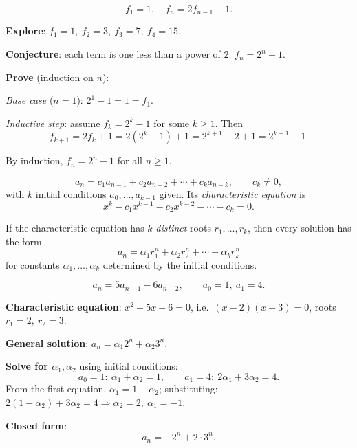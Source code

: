 \documentclass[11pt]{article}
\begin{document}
\begin{example}
\[
f_1=1,\quad f_n = 2f_{n-1}+1.
\]

\textbf{Explore}: $f_1=1,\ f_2=3,\ f_3=7,\ f_4=15$.

\textbf{Conjecture}: each term is one less than a power of $2$: $f_n = 2^n-1$.

\textbf{Prove} (induction on $n$):

\textit{Base case} ($n=1$): $2^1-1=1=f_1$.

\textit{Inductive step}: assume $f_k=2^k-1$ for some $k\ge1$. Then
\[
f_{k+1} = 2f_k+1 = 2(2^k-1)+1 = 2^{k+1}-2+1 = 2^{k+1}-1.
\]

By induction, $f_n=2^n-1$ for all $n\ge1$.
\end{example}

\bigskip
\begin{definition}
\[
a_n = c_1a_{n-1}+c_2a_{n-2}+\cdots+c_ka_{n-k}, \qquad c_k \neq 0,
\]
with $k$ initial conditions $a_0,\dots,a_{k-1}$ given. Its \emph{characteristic equation} is
\[
x^k - c_1x^{k-1}-c_2x^{k-2}-\cdots-c_k = 0.
\]
\end{definition}

\begin{theorem}
If the characteristic equation has $k$ \emph{distinct} roots $r_1,\dots,r_k$, then every solution has the form
\[
a_n = \alpha_1 r_1^n + \alpha_2 r_2^n + \cdots + \alpha_k r_k^n
\]
for constants $\alpha_1,\dots,\alpha_k$ determined by the initial conditions.
\end{theorem}

\begin{example}
\[
a_n = 5a_{n-1} - 6a_{n-2}, \qquad a_0=1,\ a_1=4.
\]

\textbf{Characteristic equation}: $x^2-5x+6=0$, i.e.\ $(x-2)(x-3)=0$, roots $r_1=2,\ r_2=3$.

\textbf{General solution}: $a_n = \alpha_1 2^n + \alpha_2 3^n$.

\textbf{Solve for $\alpha_1,\alpha_2$} using initial conditions:
\[
a_0=1:\ \alpha_1+\alpha_2=1, \qquad a_1=4:\ 2\alpha_1+3\alpha_2=4.
\]
From the first equation, $\alpha_1=1-\alpha_2$; substituting: $2(1-\alpha_2)+3\alpha_2=4 \Rightarrow \alpha_2=2,\ \alpha_1=-1$.

\textbf{Closed form}:
\[
a_n = -2^n + 2\cdot3^n.
\]
\end{example}
\end{document}
